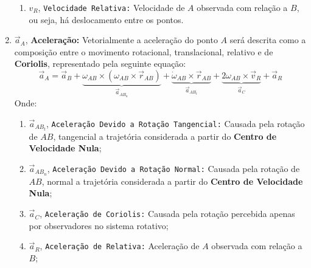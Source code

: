 \documentclass{article}
\begin{document}
\begin{enumerate}[rightmargin = \leftmargin]
\begin{enumerate}[rightmargin = \leftmargin, noitemsep]
                            \item $v_{R}$, \texttt{Velocidade Relativa:} Velocidade de $A$ observada com relação a $B$, ou seja, há deslocamento entre os pontos.
                        \end{enumerate}

                    \item $\vec{a}_{A}$, \textbf{Aceleração:} Vetorialmente a aceleração do ponto $A$ será descrita como a composição entre o movimento rotacional, translacional, relativo e de \textbf{Coriolis}, representado pela seguinte equação:
                        \begin{equation}
                            \boxed{
                                \vec{a}_{A} = 
                                \vec{a}_{B} + 
                                \underbrace{
                                    \omega_{AB}\times(\omega_{AB}\times\vec{r}_{AB})
                                }_{\vec{a}_{AB_{n}}} + 
                                \underbrace{
                                    \dot{\omega}_{AB}\times\vec{r}_{AB}
                                }_{\vec{a}_{AB_{t}}} + 
                                \underbrace{
                                    2\omega_{AB}\times\vec{v}_{R}
                                }_{\vec{a}_{C}} + 
                                \vec{a}_{R}
                            }
                        \end{equation}
                    Onde:
                        \begin{enumerate}[rightmargin = \leftmargin]
                            \item $\vec{a}_{AB_{t}}$, \texttt{Aceleração Devido a Rotação Tangencial:} Causada pela rotação de $AB$, tangencial a trajetória considerada a partir do \textbf{Centro de Velocidade Nula};

                            \item $\vec{a}_{AB_{n}}$, \texttt{Aceleração Devido a Rotação Normal:} Causada pela rotação de $AB$, normal a trajetória considerada a partir do \textbf{Centro de Velocidade Nula};

                            \item $\vec{a}_{C}$, \texttt{Aceleração de Coriolis:} Causada pela rotação percebida apenas por observadores no sistema rotativo;

                            \item $\vec{a}_{R}$, \texttt{Aceleração de Relativa:} Aceleração de $A$ observada com relação a $B$;
                        \end{enumerate}
                \end{enumerate}
\newpage
\end{document}
